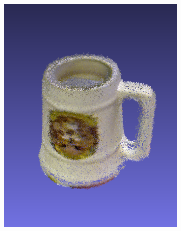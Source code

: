 \documentclass[letterpaper, 10 pt, conference]{ieeeconf}  %
\begin{document}
\begin{figure}[th]
\begin{subfigure}[b]{0.333333\linewidth}
                \includegraphics[width=\linewidth]{../models/big_mug.png}
        \end{subfigure}%
        \begin{subfigure}[b]{0.3333\linewidth}
                \centering

\end{subfigure}
\end{figure}
\end{document}
